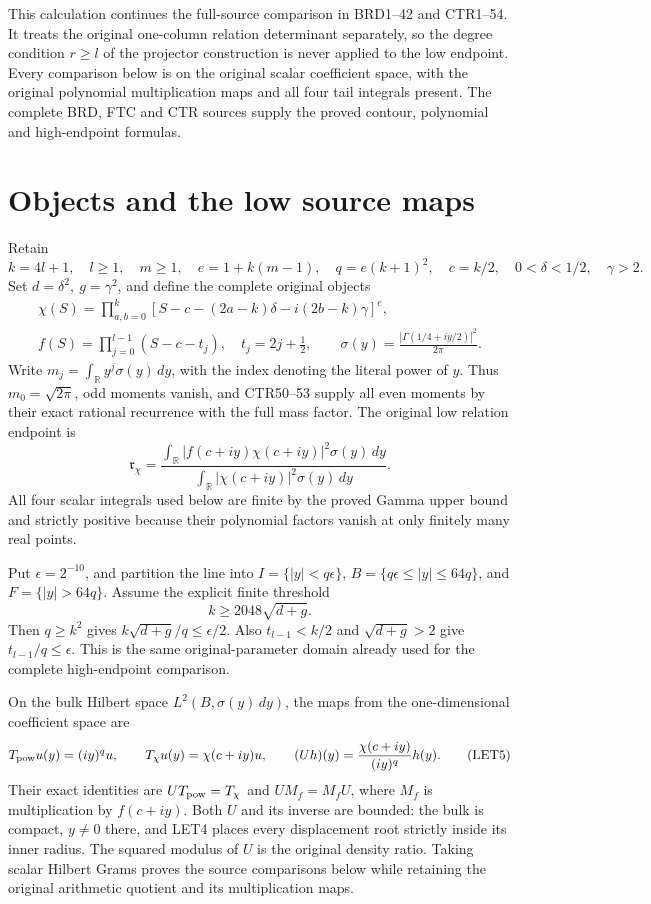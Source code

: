 


This calculation continues the full-source comparison in BRD1--42 and
CTR1--54. It treats the original one-column relation determinant separately,
so the degree condition \(r\ge l\) of the projector construction is never
applied to the low endpoint. Every comparison below is on the original
scalar coefficient space, with the original polynomial multiplication
maps and all four tail integrals present. The complete BRD, FTC and CTR
sources supply the proved contour, polynomial and high-endpoint formulas.

\section{Objects and the low source maps}
Retain
\[
 k=4l+1,\quad l\ge1,\quad m\ge1,\quad e=1+k(m-1),\quad
 q=e(k+1)^2,\quad c=k/2,\quad 0<\delta<1/2,\quad\gamma>2.
 \tag{LET1}
\]
Set \(d=\delta^2,\ g=\gamma^2\), and define the complete original objects
\[
\begin{gathered}
 \chi(S)=\prod_{a,b=0}^k
 [S-c-(2a-k)\delta-i(2b-k)\gamma]^e,\\
 f(S)=\prod_{j=0}^{l-1}(S-c-t_j),\quad t_j=2j+\tfrac12,
 \qquad \sigma(y)=\frac{|\Gamma(1/4+iy/2)|^2}{2\pi}.
\end{gathered}\tag{LET2}
\]
Write \(m_j=\int_{\mathbb R}y^j\sigma(y)\,dy\), with the index denoting the
literal power of \(y\). Thus \(m_0=\sqrt{2\pi}\), odd moments vanish, and
CTR50--53 supply all even moments by their exact rational recurrence with
the full mass factor. The original low relation endpoint is
\[
 \mathfrak r_\chi=
 \frac{\int_{\mathbb R}|f(c+iy)\chi(c+iy)|^2\sigma(y)\,dy}
      {\int_{\mathbb R}|\chi(c+iy)|^2\sigma(y)\,dy}.
 \tag{LET3}
\]
All four scalar integrals used below are finite by the proved Gamma upper
bound and strictly positive because their polynomial factors vanish at
only finitely many real points.

Put \(\epsilon=2^{-10}\), and partition the line into
\(I=\{|y|<q\epsilon\}\), \(B=\{q\epsilon\le |y|\le64q\}\), and
\(F=\{|y|>64q\}\). Assume the explicit finite threshold
\[
 k\ge2048\sqrt{d+g}.
 \tag{LET4}
\]
Then \(q\ge k^2\) gives \(k\sqrt{d+g}/q\le\epsilon/2\).
Also \(t_{l-1}<k/2\) and \(\sqrt{d+g}>2\) give
\(t_{l-1}/q\le\epsilon\). This is the same original-parameter domain
already used for the complete high-endpoint comparison.

On the bulk Hilbert space \(L^2(B,\sigma(y)\,dy)\), the maps from the
one-dimensional coefficient space are
\[
 T_{\rm pow}u(y)=(iy)^q u,\qquad
 T_\chi u(y)=\chi(c+iy)u,\qquad
 (Uh)(y)=\frac{\chi(c+iy)}{(iy)^q}h(y).
 \tag{LET5}
\]
Their exact identities are \(UT_{\rm pow}=T_\chi\) and
\(UM_f=M_fU\), where \(M_f\) is multiplication by \(f(c+iy)\).
Both \(U\) and its inverse are bounded: the bulk is compact, \(y\ne0\)
there, and LET4 places every displacement root strictly inside its inner
radius. The squared modulus of \(U\) is the original density ratio.
Taking scalar Hilbert Grams proves the source comparisons below while
retaining the original arithmetic quotient and its multiplication maps.

